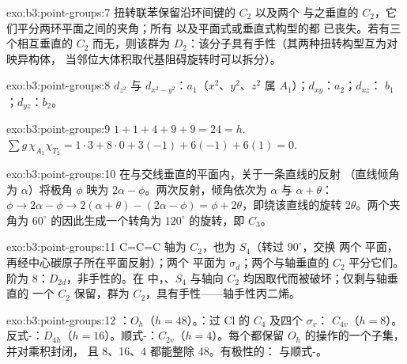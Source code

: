 \begin{solution}{exo:b3:point-groups:7}
扭转联苯保留沿环间键的 $C_2$ 以及两个
与之垂直的 $C_2$，它们平分两环平面之间的夹角；所有
以及平面式或垂直式构型的都
已丧失。若有三个相互垂直的 $C_2$ 而无，则该群为
$D_2$：该分子具有手性（其两种扭转构型互为对映异构体，
当邻位大体积取代基阻碍旋转时可以拆分）。
\end{solution}

\begin{solution}{exo:b3:point-groups:8}
$d_{z^2}$ 与 $d_{x^2-y^2}$：$a_1$（$x^2$、$y^2$、$z^2$ 属 $A_1$）；$d_{xy}$：$a_2$；$d_{xz}$：
$b_1$；$d_{yz}$：$b_2$。
\end{solution}

\begin{solution}{exo:b3:point-groups:9}
$1 + 1 + 4 + 9 + 9 = 24 = h$. $\sum g\,\chi_{A_1}\chi_{T_2} = 1\cdot3 + 8\cdot0 + 3(-1)
+ 6(-1) + 6(1) = 0$.
\end{solution}

\begin{solution}{exo:b3:point-groups:10}
在与交线垂直的平面内，关于一条直线的反射
（直线倾角为 $\alpha$）将极角 $\phi$ 映为 $2\alpha - \phi$。两次反射，倾角依次为
$\alpha$ 与 $\alpha + \theta$：$\phi \to 2\alpha - \phi \to 2(\alpha + \theta) - (2\alpha - \phi) =
\phi + 2\theta$，即绕该直线的旋转 $2\theta$。两个夹角为
$60^\circ$ 的因此生成一个转角为 $120^\circ$ 的旋转，即 $C_3$。
\end{solution}

\begin{solution}{exo:b3:point-groups:11}
C=C=C 轴为 $C_2$，也为 $S_4$（转过 $90^\circ$，交换
两个  平面，再经中心碳原子所在平面反射）；两个
 平面为 $\sigma_d$；两个与轴垂直的 $C_2$ 平分它们。
阶为 8：$D_{2d}$，非手性的。在  中，、$S_4$ 与轴向
$C_2$ 均因取代而被破坏；仅剩与轴垂直的
一个 $C_2$ 保留，群为 $C_2$，具有手性——轴手性丙二烯。
\end{solution}

\begin{solution}{exo:b3:point-groups:12}
：$O_h$（$h = 48$）。：过 Cl 的 $C_4$ 及四个 $\sigma_v$：
$C_{4v}$（$h = 8$）。反式-：$D_{4h}$（$h = 16$）。顺式-：$C_{2v}$（$h
= 4$）。每个都保留 $O_h$ 的操作的一个子集，并对乘积封闭，
且 8、16、4 都能整除 48。有极性的： 与顺式-。
\end{solution}

